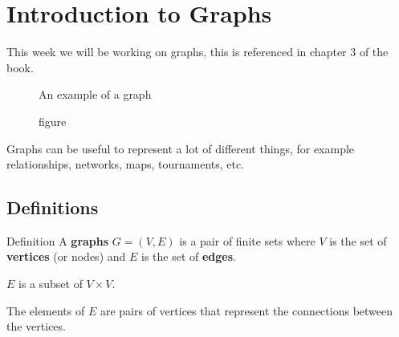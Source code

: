 \documentclass[12pt]{extarticle}
\begin{document}
\section{Introduction to Graphs}

This week we will be working on graphs, this is referenced in chapter 3 of the book.

\begin{figure}[H]
    \centering
    \caption{figure}{An example of a graph} \label{fig:graph}
\end{figure}


Graphs can be useful to represent a lot of different things,
for example relationships, networks, maps, tournaments, etc.

\subsection{Definitions}

\begin{bluebox}{Definition}
    A \textbf{graphs} $G = (V, E)$ is a pair of finite sets where
    $V$ is the set of \textbf{vertices} (or nodes) and $E$ is the set of \textbf{edges}.

    $E$ is a subset of $V \times V$.
\end{bluebox}

The elements of $E$ are pairs of vertices that represent the connections between the vertices.
\end{document}
